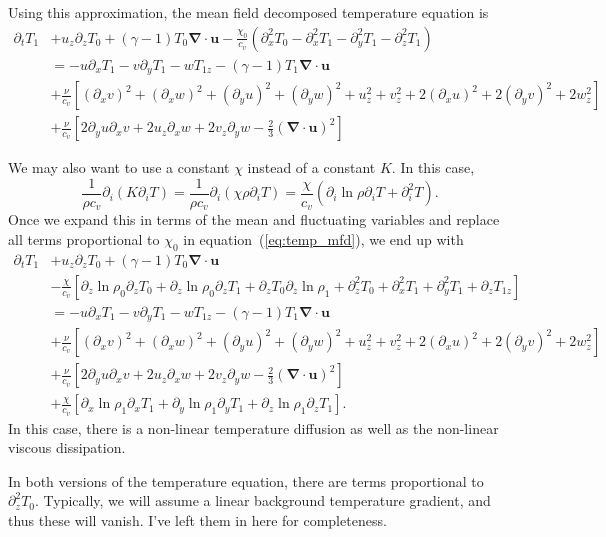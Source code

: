 \documentclass[letterpaper,12pt]{paper}
\newcommand{\lnrho}{\ensuremath{\ln \rho}}
\newcommand{\divu}{\ensuremath{\mathbf{\nabla \cdot u}}}
\begin{document}
Using this approximation, the mean field decomposed temperature
equation is 
\begin{equation}
  \label{eq:temp_mfd}
  \begin{aligned}
  \partial_t T_1 & + u_z \partial_z T_0 + (\gamma - 1) T_0 \divu  -
  \frac{\chi_0}{c_v} (\partial_x^2 T_0 -
  \partial_x^2 T_1 -
  \partial_y^2 T_1 -
  \partial_z^2 T_1)\\
  & = -u \partial_x T_1 - v \partial_y T_1 - w T_{1z} - (\gamma - 1)
  T_1 \divu\\
&+ \frac{\nu}{c_v}\left[ (\partial_x v)^2 + (\partial_x w)^2 + (\partial_y
u)^2 + (\partial_y w)^2 + u_z^2 + v_z^2 + 2 (\partial_x u)^2 + 2
(\partial_y v)^2 + 2 w_z^2\right] \\
& + \frac{\nu}{c_v}\left[2 \partial_y u \partial_x v + 2 u_z \partial_x w + 2 v_z \partial_y
w - \frac{2}{3} (\divu)^2 \right]
\end{aligned}
\end{equation}

We may also want to use a constant $\chi$ instead of a constant
$K$. In this case, 
\begin{equation}
  \label{eq:constant_chi}
  \frac{1}{\rho c_v} \partial_i (K \partial_i T) = \frac{1}{\rho
    c_v} \partial_i (\chi \rho \partial_i T) = \frac{\chi}{c_v}
  \left( \partial_i \lnrho \partial_i T + \partial_i^2 T \right).
\end{equation}
Once we expand this in terms of the mean and fluctuating variables and
replace all terms proportional to $\chi_0$ in
equation~(\ref{eq:temp_mfd}), we end up with
\begin{equation}
  \label{eq:temp_const_chi_mfd}
  \begin{aligned}
  \partial_t T_1 & + u_z \partial_z T_0 + (\gamma - 1) T_0 \divu  \\
  &-\frac{\chi}{c_v}\left[ \partial_z \lnrho_0 \partial_z T_0 +
    \partial_z \lnrho_0 \partial_z T_1 + \partial_z T_0 \partial_z
    \lnrho_1 + \partial_z^2 T_0 + \partial_x^2 T_1 + \partial_y^2 T_1
    + \partial_z T_{1z}\right]\\
  & = -u \partial_x T_1 - v \partial_y T_1 - w T_{1z} - (\gamma - 1)
  T_1 \divu\\
&+ \frac{\nu}{c_v}\left[ (\partial_x v)^2 + (\partial_x w)^2 + (\partial_y
u)^2 + (\partial_y w)^2 + u_z^2 + v_z^2 + 2 (\partial_x u)^2 + 2
(\partial_y v)^2 + 2 w_z^2\right] \\
& + \frac{\nu}{c_v}\left[2 \partial_y u \partial_x v + 2 u_z \partial_x w + 2 v_z \partial_y
w - \frac{2}{3} (\divu)^2 \right]\\
& + \frac{\chi}{c_v} \left[ \partial_x \lnrho_1 \partial_x T_1
  + \partial_y \lnrho_1 \partial_y T_1 + \partial_z \lnrho_1 \partial_z T_1\right].
\end{aligned}
\end{equation}
In this case, there is a non-linear temperature diffusion as well as
the non-linear viscous dissipation.

In both versions of the temperature equation, there are terms
proportional to $\partial_z^2 T_0$. Typically, we will assume a linear
background temperature gradient, and thus these will vanish. I've left
them in here for completeness.
\end{document}
